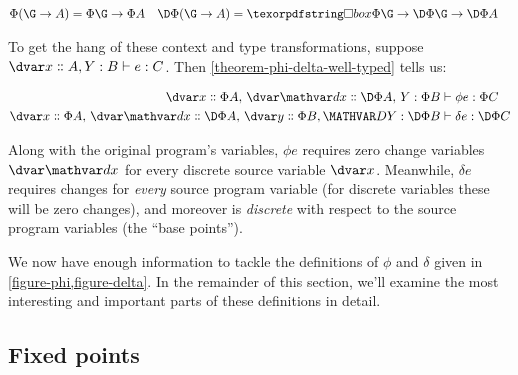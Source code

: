 \begin{align*}
  \Phi(\G \to A) &= \Phi\G \to \Phi A
  & \DP(\G \to A) &= \iso\Phi\G \to \DP\G \to \DP A
\end{align*}

\noindent
To get the hang of these context and type transformations, suppose $\J
e {\hd x A, \hm y B} C$. Then \cref{theorem-phi-delta-well-typed} tells us:

\nopagebreak[1]
\begin{align*}
  \Jalign{\phi e} {\hd x{\Phi A},\, \hd \dx {\DP A},\, \hm y {\Phi B}} {\Phi C}
  \\
  \Jalign{\delta e} {\hd x{\Phi A},\, \hd\dx{\DP A},\, \hd y{\Phi B}, \hm\dy{\DP B}} {\DP C}
\end{align*}


\noindent
Along with the original program's variables, $\phi e$ requires zero change
variables $\dvar\dx$ for every discrete source variable $\dvar x$. Meanwhile,
$\delta e$ requires changes for \emph{every} source program variable (for
discrete variables these will be zero changes), and moreover is \emph{discrete}
with respect to the source program variables (the ``base points'').

We now have enough information to tackle the definitions of $\phi$ and $\delta$
given in \cref{figure-phi,figure-delta}. In the remainder of this section, we'll
examine the most interesting and important parts of these definitions in detail.


\subsection{Fixed points}

